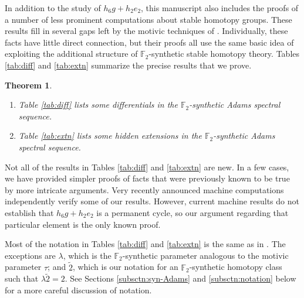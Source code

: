 \documentclass{amsart}
\newtheorem{thm}{Theorem}[section]
\theoremstyle{definition}
\newcommand{\F}{\mathbb{F}}
\newcommand{\hsf}{\widetilde{2}}
\begin{document}
In addition to the study of $h_6 g + h_2 e_2$, this manuscript also
includes the proofs of a number of less prominent computations
about stable homotopy groups.  
These results fill in several gaps left by the motivic techniques
of \cite{IWX}.
Individually, these facts have little direct connection,
but their proofs all use the same basic idea of exploiting the additional structure of $\F_2$-synthetic stable homotopy theory.
Tables \ref{tab:diff} and \ref{tab:extn} summarize the precise
results that we prove.

\begin{thm}
\label{thm:diff-extn}
\mbox{}
\begin{enumerate}
\item
Table \ref{tab:diff} lists some differentials in the $\F_2$-synthetic
Adams spectral sequence.
\item
Table \ref{tab:extn} lists some hidden extensions in the $\F_2$-synthetic
Adams spectral sequence.
\end{enumerate}
\end{thm}

Not all of the results in Tables \ref{tab:diff} and
\ref{tab:extn} are new.  In a few cases, we have provided simpler
proofs of facts that were previously known to be true by more intricate
arguments. 
Very recently announced machine computations \cite{LWX}
independently verify some of our results.  However, 
current machine results do not establish that $h_6 g + h_2 e_2$ 
is a permanent cycle, so our argument regarding that particular
element is the only known proof.


Most of the notation in Tables \ref{tab:diff} and \ref{tab:extn}
is the same as in \cite{IWX}.  The exceptions are $\lambda$,
which is the $\F_2$-synthetic parameter analogous to the motivic parameter
$\tau$; and $\hsf$, which is our notation for an $\F_2$-synthetic homotopy
class such that $\lambda \hsf = 2$.  See Sections 
\ref{subsctn:syn-Adams} and \ref{subsctn:notation}
below for a more careful discussion of notation.
\end{document}
